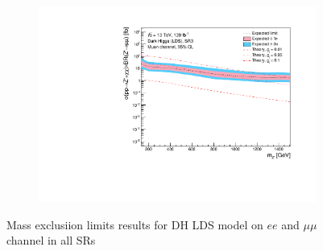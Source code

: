 \documentclass[12pt, a4paper]{book}
\begin{document}
\begin{figure}[!ht]
\begin{subfigure}[b]{0.49\textwidth}
   \end{subfigure}
   \hfill
   \begin{subfigure}[b]{0.49\textwidth}
      \centering
      \includegraphics[width=1\textwidth]{Limits/Model_independent/150/DH_LDS/mass_exclusion_uu.pdf}
   \end{subfigure}
   \caption{Mass exclusiion limits results for DH LDS model on $ee$ and $\mu\mu$ channel in all SRs}\label{fig:DH_LDS_me_SRS}
\end{figure}
\end{document}
